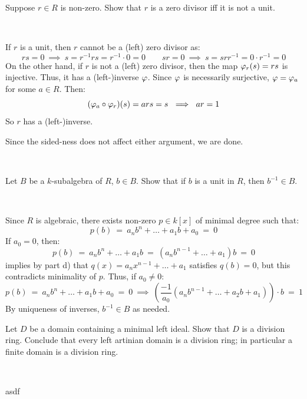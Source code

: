 \begin{exr}[title=Exercise 1.13 part d)]
	Suppose $r\in R$ is non-zero.
	Show that $r$ is a zero divisor iff it is not a unit.
\end{exr} \

\begin{pf}
	If $r$ is a unit, then $r$ cannot be a (left) zero divisor as:
	\begin{equation*}
	    rs = 0 \ \implies \ s = r^{-1}rs = r^{-1}\cdot0 = 0 \qquad
	    sr = 0 \ \implies \ s = srr^{-1} = 0\cdot r^{-1} = 0
	\end{equation*}
	On the other hand, if $r$ is not a (left) zero divisor, then the map
	$\varphi_{r}(s)=rs$ is injective. Thus, it has a (left-)inverse $\varphi$.
	Since $\varphi$ is necessarily surjective, $\varphi=\varphi_{a}$ for some $a\in R$.
	Then:
	\begin{equation*}
		(\varphi_{a}\circ\varphi_{r})(s) = ars = s \ \implies \ ar=1
	\end{equation*}
	So $r$ has a (left-)inverse.

	Since the sided-ness does not affect either argument, we are done.
\end{pf} \

\begin{exr}[title=Exercise 1.13 part e)]
	Let $B$ be a $k$-subalgebra of $R$, $b\in B$.
	Show that if $b$ is a unit in $R$, then $b^{-1}\in B$.
\end{exr} \

\begin{pf}
	Since $R$ is algebraic, there exists non-zero $p\in k[x]$ of minimal degree
	such that:
	\begin{equation*}
		p(b) \ = \ a_{n}b^{n}+ \dots + a_{1}b + a_{0} \ = \ 0
	\end{equation*}
	If $a_{0}=0$, then:
	\begin{equation*}
		p(b) \ = \ a_{n}b^{n} + \dots + a_{1}b
		\ = \ (a_{n}b^{n-1} + \dots  + a_{1})b
		\ = \ 0
	\end{equation*}
	implies by part d) that $q(x)=a_{n}x^{n-1} + \dots + a_{1}$ satisfies
	$q(b)=0$, but this contradicts minimality of $p$.
	Thus, if $a_{0}\neq0$:
	\begin{equation*}
	    p(b) \ = \ a_{n}b^{n}+ \dots + a_{1}b + a_{0} \ = \ 0
		\ \implies \
		\left(\frac{-1}{a_{0}}(a_{n}b^{n-1}+\dots +a_{2}b+a_{1})\right)\cdot b
		\ = \ 1
	\end{equation*}
	By uniqueness of inverses, $b^{-1}\in B$ as needed.
\end{pf}


\nq
\begin{exr}[title=Exercise 1.19] %
	Let $D$ be a domain containing a minimal left ideal.
	Show that $D$ is a division ring.
	Conclude that every left artinian domain is a division ring;
	in particular a finite domain is a division ring.
\end{exr} \

\begin{pf}
	asdf
\end{pf}
